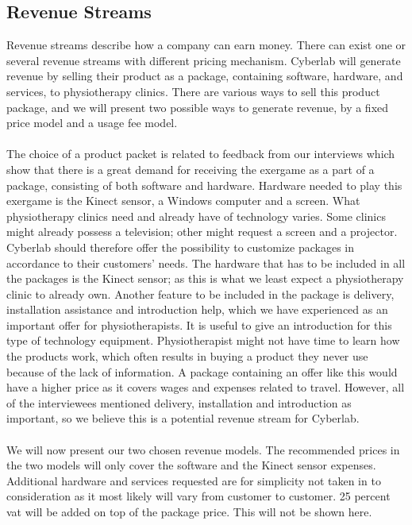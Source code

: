 \subsection{Revenue Streams}
Revenue streams describe how a company can earn money. There can exist one or several revenue streams with different pricing mechanism. Cyberlab will generate revenue by selling their product as a package, containing software, hardware, and services, to physiotherapy clinics. There are various ways to sell this product package, and we will present two possible ways to generate revenue, by a fixed price model and a usage fee model. \\ \\ 
The choice of a product packet is related to feedback from our interviews which show that there is a great demand for receiving the exergame as a part of a package, consisting of both software and hardware. Hardware needed to play this exergame is the Kinect sensor, a Windows computer and a screen. What physiotherapy clinics need and already have of technology varies. Some clinics might already possess a television; other might request a screen and a projector. Cyberlab should therefore offer the possibility to customize packages in accordance to their customers' needs. The hardware that has to be included in all the packages is the Kinect sensor; as this is what we least expect a physiotherapy clinic to already own. Another feature to be included in the package is delivery, installation assistance and introduction help, which we have experienced as an important offer for physiotherapists. It is useful to give an introduction for this type of technology equipment. Physiotherapist might not have time to learn how the products work, which often results in buying a product they never use because of the lack of information. A package containing an offer like this would have a higher price as it covers wages and expenses related to travel. However, all of the interviewees mentioned delivery, installation and introduction as important, so we believe this is a potential revenue stream for Cyberlab. \\ \\ 
We will now present our two chosen revenue models. The recommended prices in the two models will only cover the software and the Kinect sensor expenses. Additional hardware and services requested are for simplicity not taken in to consideration as it most likely will vary from customer to customer. 25 percent \ac{vat} will be added on top of the package price. This will not be shown here.\\ \\
